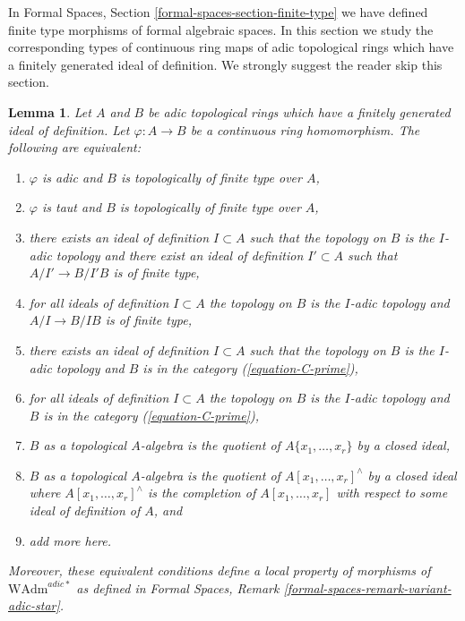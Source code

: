 \documentclass{stacks-project}
\theoremstyle{plain}
\newtheorem{lemma}[subsection]{Lemma}
\theoremstyle{definition}
\theoremstyle{remark}
\numberwithin{equation}{subsection}
\begin{document}
\noindent
In Formal Spaces, Section \ref{formal-spaces-section-finite-type}
we have defined finite type morphisms of formal algebraic spaces.
In this section we study the corresponding types of continuous
ring maps of adic topological rings which have a finitely generated
ideal of definition. We strongly suggest the reader skip this section.

\begin{lemma}
\label{lemma-finite-type}
Let $A$ and $B$ be adic topological rings which have a finitely generated
ideal of definition. Let $\varphi : A \to B$ be a continuous ring homomorphism.
The following are equivalent:
\begin{enumerate}
\item $\varphi$ is adic and $B$ is topologically of finite type over $A$,
\item $\varphi$ is taut and $B$ is topologically of finite type over $A$,
\item there exists an ideal of definition $I \subset A$ such that
the topology on $B$ is the $I$-adic topology and there exist an ideal
of definition $I' \subset A$ such that $A/I' \to B/I'B$ is of finite type,
\item for all ideals of definition $I \subset A$ the topology on $B$
is the $I$-adic topology and $A/I \to B/IB$ is of finite type,
\item there exists an ideal of definition $I \subset A$ such that
the topology on $B$ is the $I$-adic topology and $B$ is in the category
(\ref{equation-C-prime}),
\item for all ideals of definition $I \subset A$ the topology on $B$
is the $I$-adic topology and $B$ is in the category (\ref{equation-C-prime}),
\item $B$ as a topological $A$-algebra is the quotient of
$A\{x_1, \ldots, x_r\}$ by a closed ideal,
\item $B$ as a topological $A$-algebra is the quotient of
$A[x_1, \ldots, x_r]^\wedge$ by a closed ideal where
$A[x_1, \ldots, x_r]^\wedge$ is the completion of $A[x_1, \ldots, x_r]$
with respect to some ideal of definition of $A$, and
\item add more here.
\end{enumerate}
Moreover, these equivalent conditions define
a local property of morphisms of $\text{WAdm}^{adic*}$ as defined in
Formal Spaces, Remark \ref{formal-spaces-remark-variant-adic-star}.
\end{lemma}
\end{document}
